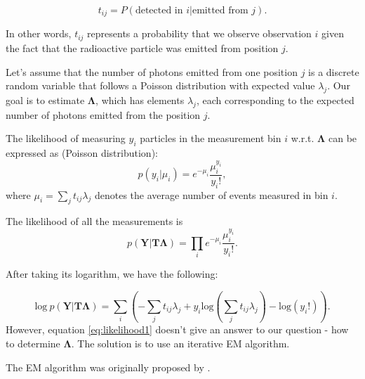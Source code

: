 {  \begin{equation}
    t_{ij} =  P(\textrm{detected in } i | \textrm{emitted from } j).
  \end{equation}

  In other words, $t_{ij}$ represents a probability that we observe observation $i$ given the fact that the radioactive particle was emitted from position $j$.

  Let's assume that the number of photons emitted from one position $j$ is a discrete random variable that follows a Poisson distribution with expected value $\lambda_{j}$.
  Our goal is to estimate $\mathbf{\Lambda}$, which has elements $\lambda_{j}$, each corresponding to the expected number of photons emitted from the position $j$.

  The likelihood of measuring $y_{i}$ particles in the measurement bin $i$ w.r.t. $\mathbf{\Lambda}$ can be expressed as (Poisson distribution):
  \begin{equation}
    p(y_{i} |\mu_{i} ) = e^{-\mu_{i}} \frac{\mu_{i}^{y_i}}{y_{i}!},
  \end{equation}
  where $\mu_{i} = \sum_{j} t_{ij}\lambda_{j}$ denotes the average number of events measured in bin $i$.

  The likelihood of all the measurements is
  \begin{equation}  
    p(\mathbf{Y} | \mathbf{T\Lambda} ) = \prod_{i} e^{-\mu_{i}} \frac{\mu_{i}^{y_i}}{y_{i}!}.
  \end{equation}

  After taking its logarithm, we have the following:

  \begin{equation}  
    \mathrm{log}\ p(\mathbf{Y} | \mathbf{T\Lambda} ) = \sum_{i}\left ( -\sum_{j} t_{ij}\lambda_{j} + y_{i} \mathrm{log}(\sum_{j} t_{ij}\lambda_{j})  - \mathrm{log}(y_{i}!) \right ).
    \label{eq:likelihood1}
  \end{equation}
  However, equation \ref{eq:likelihood1} doesn't give an answer to our question - how to determine $\mathbf{\Lambda}$. The solution is to use an iterative \ac{EM} algorithm.

  The \ac{EM} algorithm was originally proposed by \cite{EM}. 

}

